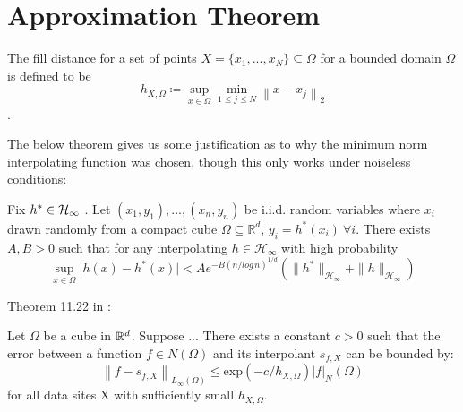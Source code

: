 \documentclass[english]{article}
\newcommand\norm[1]{\left\lVert#1\right\rVert}
\begin{document}
\section{Approximation Theorem} \label{sec:AppThm}
\begin{defn}
	The fill distance for a set of points $X = \{x_1, ..., x_N\} \subseteq \Omega$ for a bounded domain $\Omega$ is defined to be
	\[
	h_{X,\Omega} \coloneqq \sup_{x \in \Omega}\min_{1 \leq j \leq N} \norm{x- x_j}_2
	\].
\end{defn}
The below theorem gives us some justification as to why the minimum norm interpolating function was chosen, though this only works under noiseless conditions:
\begin{thm} \label{thm:approx}
	Fix $h^* \in \mathcal{H}_\infty $  .
Let $(x_1,y_1), ..., (x_n,y_n)$ be i.i.d. random variables where $x_i$ drawn randomly from a compact cube $\Omega \subseteq \mathbb{R}^d $,
$y_i = h^*(x_i) \: \forall i$. There exists $A, B > 0$ such that for any interpolating $h \in \mathcal{H}_\infty $ with high probability
\begin{equation*}
\sup_{x \in \Omega} \vert h(x) - h^*(x)\vert < A e^{-B(n/log \, n)^{1/d}} (\| h^* \|_{\mathcal{H}_\infty} + \| h \|_{\mathcal{H}_\infty})
\end{equation*}
\end{thm}
Theorem 11.22 in \cite{ScatteredDataApproximation}:

Let $\Omega$ be a cube in $\mathbb{R}^d$. Suppose ... There exists a constant $c > 0$ such that the error between a function $f \in N(\Omega)$ and its interpolant $s_{f,X}$ can be bounded by:
\begin{equation*}
\norm{f - s_{f,X}}_{L_\infty(\Omega)} \leq \text{exp}(-c/h_{X,\Omega})|f|_N(\Omega)
\end{equation*}
for all data sites X with sufficiently small $h_{X,\Omega}$.
\end{document}
